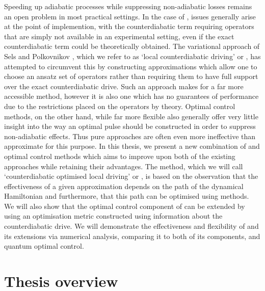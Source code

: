 Speeding up adiabatic processes while suppressing non-adiabatic losses remains an open problem in most practical settings. In the case of , issues generally arise at the point of implemention, with the counterdiabatic term requiring operators that are simply not available in an experimental setting, even if the exact counterdiabatic term could be theoretically obtained. The variational approach of Sels and Polkovnikov \cite{sels_minimizing_2017}, which we refer to as `local counterdiabatic driving' or , has attempted to circumvent this by constructing approximations which allow one to choose an ansatz set of operators rather than requiring them to have full support over the exact counterdiabatic drive. Such an approach makes for a far more accessible method, however it is also one which has no guarantees of performance due to the restrictions placed on the operators by  theory. Optimal control methods, on the other hand, while far more flexible also generally offer very little insight into the way an optimal pulse should be constructed in order to suppress non-adiabatic effects. Thus pure  approaches are often even more ineffective than approximate  for this purpose. In this thesis, we present a new combination of  and optimal control methods which aims to improve upon both of the existing approaches while retaining their advantages. The method, which we will call `counterdiabatic optimised local driving' or  \cite{cepaite_counterdiabatic_2023}, is based on the observation that the effectiveness of a given  approximation depends on the path of the dynamical Hamiltonian and furthermore, that this path can be optimised using  methods. We will also show that the optimal control component of  can be extended by using an optimisation metric constructed using information about the counterdiabatic drive. We will demonstrate the effectiveness and flexibility of  and its extensions via numerical analysis, comparing it to both of its components,  and quantum optimal control.

\section{Thesis overview}

